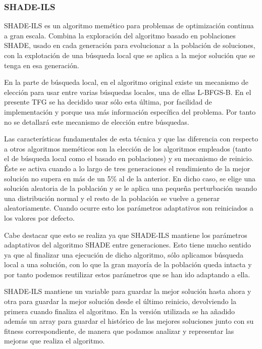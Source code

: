 \subsubsection{SHADE-ILS}
\label{sec:shade-ils}


SHADE-ILS \cite{shadeils} es un algoritmo memético para problemas de optimización continua a gran escala. Combina la exploración del algoritmo basado en poblaciones SHADE, usado en cada generación para evolucionar a la población de soluciones, con la explotación de una búsqueda local que se aplica a la mejor solución que se tenga en esa generación. 

En la parte de búsqueda local, en el algoritmo original existe un mecanismo de elección para usar entre varias búsquedas locales, una de ellas L-BFGS-B. En el presente TFG se ha decidido usar sólo esta última, por facilidad de implementación y porque usa más información específica del problema. Por tanto no se detallará este mecanismo de elección entre búsquedas.

Las características fundamentales de esta técnica y que las diferencia con respecto a otros algoritmos meméticos son la elección de los algoritmos empleados (tanto el de búsqueda local como el basado en poblaciones) y su mecanismo de reinicio. Éste se activa cuando a lo largo de tres generaciones el rendimiento de la mejor solución no supera en más de un 5\% al de la anterior. En dicho caso, se elige una solución aleatoria de la población y se le aplica una pequeña perturbación usando una distribución normal y el resto de la población se vuelve a generar aleatoriamente. Cuando ocurre esto los parámetros adaptativos son reiniciados a los valores por defecto.

Cabe destacar que esto se realiza ya que SHADE-ILS mantiene los parámetros adaptativos del algoritmo SHADE entre generaciones. Esto tiene mucho sentido ya que al finalizar una ejecución de dicho algoritmo, sólo aplicamos búsqueda local a una solución, con lo que la gran mayoría de la población queda intacta y por tanto podemos reutilizar estos parámetros que se han ido adaptando a ella. 

SHADE-ILS mantiene un variable para guardar la mejor solución hasta ahora y otra para guardar la mejor solución desde el último reinicio, devolviendo la primera cuando finaliza el algoritmo. En la versión utilizada se ha añadido además un array para guardar el histórico de las mejores soluciones junto con su fitness correspondiente, de manera que podamos analizar y representar las mejoras que realiza el algoritmo.


